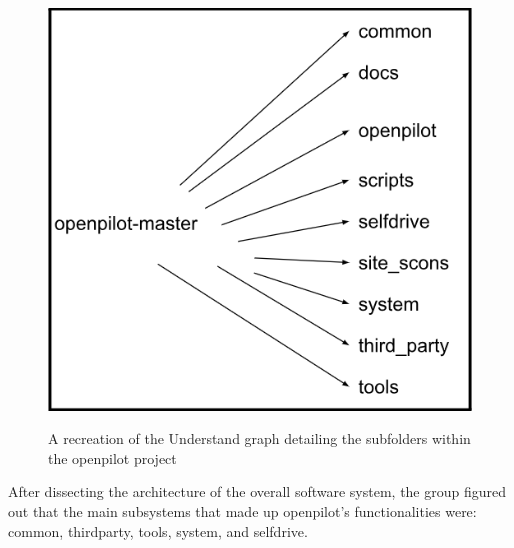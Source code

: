 \documentclass[12pt]{article}
\begin{document}
    \begin{figure}[H]
        \centering
        \includegraphics[scale=0.75]{openpilot architecture.png}\\
        \caption{A recreation of the Understand graph detailing the subfolders within the openpilot project}
        \label{fig:enter-label}
    \end{figure}

After dissecting the architecture of the overall software system, the group figured out that the main subsystems that made up openpilot's functionalities were: common, third\textunderscore party, tools, system, and selfdrive.
\vspace{10pt}
\end{document}
